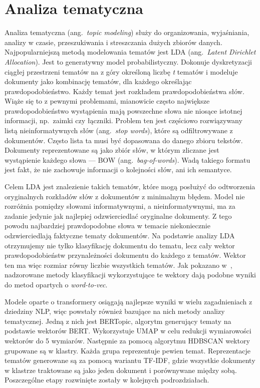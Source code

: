 
\chapter{Analiza tematyczna}
	Analiza tematyczna (ang.\ \emph{topic modeling}) służy do organizowania, wyjaśniania, analizy w czasie, przeszukiwania i streszczania dużych zbiorów danych.
	Najpopularniejszą metodą modelowania tematów jest LDA (ang.\ \emph{Latent Dirichlet Allocation})\cite{LDA}.
	Jest to generatywny model probabilistyczny.
	Dokonuje dyskretyzacji ciągłej przestrzeni tematów na z góry określoną liczbę \emph{t} tematów
		i modeluje dokumenty jako kombinację tematów, dla każdego określając prawdopodobieństwo.
	Każdy temat jest rozkładem prawdopodobieństwa słów.
	Wiąże się to z pewnymi problemami, mianowicie często największe prawdopodobieństwo wystąpienia mają powszechne słowa nie niosące istotnej informacji, np.\ zaimki czy łączniki.
	Problem ten jest częściowo rozwiązywany listą nieinformatywnych słów (ang.\ \emph{stop words}), które są odfiltrowywane z dokumentów.
	Często lista ta musi być dopasowana do danego zbioru tekstów.
	Dokumenty reprezentowane są jako zbiór słów, w którym zliczane jest wystąpienie każdego słowa --- BOW (ang.\ \emph{bag-of-words}).
	Wadą takiego formatu jest fakt, że nie zachowuje informacji o kolejności słów, ani ich semantyce.

	Celem LDA jest znalezienie takich tematów, które mogą posłużyć do odtworzenia oryginalnych rozkładów słów z dokumentów z minimalnym błędem.
	Model nie rozróżnia pomiędzy słowami informatywnymi, a nieinformatywnymi, ma za zadanie jedynie jak najlepiej odzwierciedlać oryginalne dokumenty.
	Z tego powodu najbardziej prawdopodobne słowa w temacie niekoniecznie odzwierciedlają faktyczne tematy dokumentów.
	Na podstawie analizy LDA otrzymujemy nie tylko klasyfikację dokumentu do tematu, lecz cały wektor prawdopodobieństw przynależności dokumentu do każdego z tematów.
	Wektor ten ma więc rozmiar równy liczbie wszystkich tematów.
	Jak pokazano w~\cite{BoW_PL}, nadzorowane metody klasyfikacji wykorzystujące te wektory dają podobne wyniki do metod opartych o \emph{word-to-vec}.

	Modele oparte o transformery osiągają najlepsze wyniki w wielu zagadnieniach z dziedziny NLP\cite{KLEJ},
		więc powstały również bazujące na nich metody analizy tematycznej.
	Jedną z nich jest BERTopic\cite{BERTopic}, algorytm generujący tematy na podstawie wektorów BERT\@.
	Wykorzystuje UMAP\cite{UMAP} w celu redukcji wymiarowości wektorów do 5 wymiarów.
	Następnie za pomocą algorytmu HDBSCAN\cite{HDBSCAN} wektory grupowane są w klastry.
	Każda grupa reprezentuje pewien temat.
	Reprezentacje tematów generowane są za pomocą wariantu TF-IDF\@,
		gdzie wszystkie dokumenty w klastrze traktowane są jako jeden dokument i porównywane między sobą.
	Poszczególne etapy rozwinięte zostały w kolejnych podrozdziałach.

